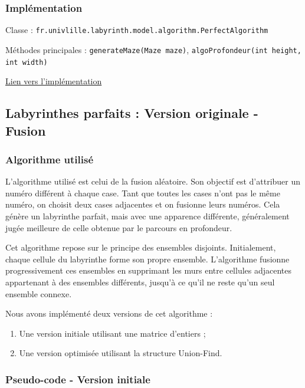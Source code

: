 \documentclass{butexFR}
\begin{document}
\subsubsection{Implémentation}

Classe : \texttt{fr.univlille.labyrinth.model.algorithm.PerfectAlgorithm}

Méthodes principales : \texttt{generateMaze(Maze maze)}, \texttt{algoProfondeur(int height, int width)}

\href{https://gitlab.univ-lille.fr/sae302/2025/G2_SAE3.3/-/blob/master/labyrinth/src/main/java/fr/univlille/labyrinth/model/algorithm/PerfectAlgorithm.java?ref_type=heads}{Lien vers l'implémentation}

\newpage 

\subsection{Labyrinthes parfaits : Version originale - Fusion}

\subsubsection{Algorithme utilisé}

L'algorithme utilisé est celui de la fusion aléatoire. Son objectif est d'attribuer un numéro différent à chaque case. Tant que toutes les cases n'ont pas le même numéro, on choisit deux cases adjacentes et on fusionne leurs numéros. Cela génère un labyrinthe parfait, mais avec une apparence différente, généralement jugée meilleure de celle obtenue par le parcours en profondeur.

Cet algorithme repose sur le principe des ensembles disjoints. Initialement, chaque cellule du labyrinthe forme son propre ensemble. L'algorithme fusionne progressivement ces ensembles en supprimant les murs entre cellules adjacentes appartenant à des ensembles différents, jusqu'à ce qu'il ne reste qu'un seul ensemble connexe.

Nous avons implémenté deux versions de cet algorithme :
\begin{enumerate}
    \item Une version initiale utilisant une matrice d'entiers ;
    \item Une version optimisée utilisant la structure Union-Find.
\end{enumerate}

\newpage

\subsubsection{Pseudo-code - Version initiale}
\end{document}
